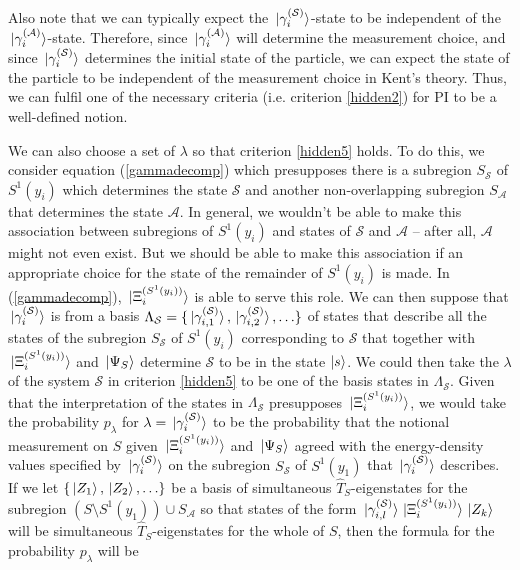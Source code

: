 Also note that we can typically expect the $\ket*{\gamma_i^{(\mathcal{S})}}$-state to be independent of the $\ket*{\gamma_i^{(\mathcal{A})}}$-state. Therefore, since $\ket*{\gamma_i^{(\mathcal{A})}}$ will determine the measurement choice, and since $\ket*{\gamma_i^{(\mathcal{S})}}$ determines the initial state of the particle, we can expect the state of the particle to be independent of the measurement choice in Kent's theory. Thus, we can fulfil one of the necessary criteria (i.e. criterion \ref{hidden2}) for PI to be a well-defined notion.

We can also choose a set of $\lambda$ so that criterion \ref{hidden5} holds. To do this, we consider equation (\ref{gammadecomp}) which presupposes there is a subregion $S_{\mathcal{S}}$ of $S^1(y_i)$ which determines the state $\mathcal{S}$ and another non-overlapping subregion $S_{\mathcal{A}}$ that determines the state $\mathcal{A}$. In general, we wouldn't be able to make this association between subregions of $S^1(y_i)$ and states of  $\mathcal{S}$  and $\mathcal{A}$ -- after all, $\mathcal{A}$ might not even exist. But we should be able to make this association if an appropriate choice for the state of the remainder of $S^1(y_i)$ is made. In (\ref{gammadecomp}), $\ket*{\Xi_i^{(S^1(y_i))}}$ is able to serve this role. We can then suppose that $\ket*{\gamma_i^{(\mathcal{S})}}$ is from a basis $\Lambda_{\mathcal{S}}=\{\ket*{\gamma_{i,1}^{(\mathcal{S})}},\ket*{\gamma_{i,2}^{(\mathcal{S})}},\ldots\}$ of states that describe all the states of the subregion $S_{\mathcal{S}}$ of $S^1(y_i)$ corresponding to $\mathcal{S}$ that together with $\ket*{\Xi_i^{(S^1(y_i))}}$ and $\ket*{\Psi_S}$ determine $\mathcal{S}$ to be in the state $\ket{s}$. We could then take the $\lambda$ of the system $\mathcal{S}$ in criterion \ref{hidden5} to be one of the basis states in $\Lambda_{\mathcal{S}}$. Given that the interpretation of the states in $\Lambda_{\mathcal{S}}$ presupposes $\ket*{\Xi_i^{(S^1(y_i))}}$, we would take the probability $p_\lambda$ for $\lambda = \ket*{\gamma_i^{(\mathcal{S})}}$ to be the probability that the notional measurement on $S$ given $\ket*{\Xi_i^{(S^1(y_i))}}$ and $\ket*{\Psi_S}$ agreed with the energy-density values specified by $ \ket*{\gamma_i^{(\mathcal{S})}}$ on the subregion $S_{\mathcal{S}}$ of $S^1(y_1)$ that $ \ket*{\gamma_i^{(\mathcal{S})}}$ describes. If we let $\{\ket*{Z_1}, \ket*{Z_2},\ldots  \}$ be a basis of simultaneous $\hat{T}_S$-eigenstates for the subregion $(S\setminus S^1(y_1))\cup S_{\mathcal{A}}$ so that states of the form $\ket*{\gamma_{i,l}^{(\mathcal{S})}}\ket*{\Xi_i^{(S^1(y_i))}}\ket*{Z_k}$ will be simultaneous $\hat{T}_S$-eigenstates for the whole of $S$, then the formula for the probability $p_\lambda$ will be 
